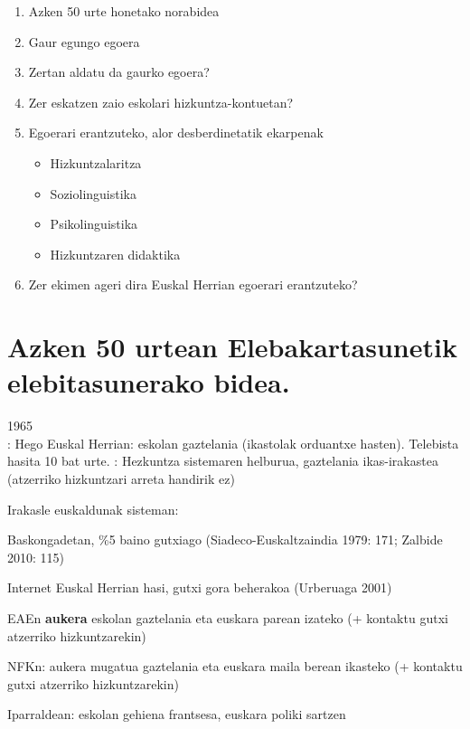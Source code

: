 \documentclass[
]{book}
\providecommand{\tightlist}{%
  \setlength{\itemsep}{0pt}\setlength{\parskip}{0pt}}
\begin{document}
\begin{enumerate}
\def\labelenumi{\arabic{enumi}.}
\tightlist
\item
  Azken 50 urte honetako norabidea
\item
  Gaur egungo egoera
\item
  Zertan aldatu da gaurko egoera?
\item
  Zer eskatzen zaio eskolari hizkuntza-kontuetan?
\item
  Egoerari erantzuteko, alor desberdinetatik ekarpenak

  \begin{itemize}
  \tightlist
  \item
    Hizkuntzalaritza
  \item
    Soziolinguistika
  \item
    Psikolinguistika
  \item
    Hizkuntzaren didaktika\\
  \end{itemize}
\item
  Zer ekimen ageri dira Euskal Herrian egoerari erantzuteko?
\end{enumerate}

\hypertarget{azken-50-urtean-elebakartasunetik-elebitasunerako-bidea.}{%
\section{\texorpdfstring{Azken 50 urtean Elebakartasunetik elebitasunerako bidea.}{Azken 50 urtean  Elebakartasunetik elebitasunerako bidea.}}\label{azken-50-urtean-elebakartasunetik-elebitasunerako-bidea.}}

1965\\
: Hego Euskal Herrian: eskolan gaztelania (ikastolak orduantxe hasten). Telebista hasita 10 bat urte.
: Hezkuntza sistemaren helburua, gaztelania ikas-irakastea (atzerriko hizkuntzari arreta handirik ez)

Irakasle euskaldunak sisteman:

\begin{description}
\tightlist
\item[1976]
Baskongadetan, \%5 baino gutxiago (Siadeco-Euskaltzaindia 1979: 171; Zalbide 2010: 115)
\item[1993]
Internet Euskal Herrian hasi, gutxi gora beherakoa (Urberuaga 2001)
\item[1995:]
EAEn \textbf{aukera} eskolan gaztelania eta euskara parean izateko (+ kontaktu gutxi atzerriko hizkuntzarekin)

NFKn: aukera mugatua gaztelania eta euskara maila berean ikasteko (+ kontaktu gutxi atzerriko hizkuntzarekin)

Iparraldean: eskolan gehiena frantsesa, euskara poliki sartzen
\end{description}
\end{document}
